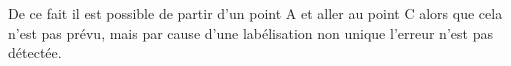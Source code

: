 De ce fait il est possible de partir d'un point A et aller au point C alors que cela n'est pas prévu, mais par cause d'une labélisation non unique l'erreur n'est pas détectée.


%
%
%
%
%
%
%

